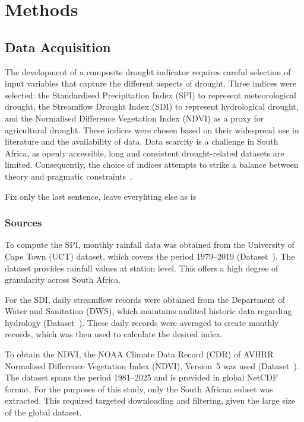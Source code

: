 \graphicspath{{methods/fig/}}

\chapter{Methods}
\label{chap:methods}
\section{Data Acquisition}
\label{sec:data_acquisition}
The development of a composite drought indicator requires careful selection of input variables that capture the different aspects of drought. Three indices were selected: the Standardised Precipitation Index (SPI) to represent meteorological drought, the Streamflow Drought Index (SDI) to represent hydrological drought, and the Normalised Difference Vegetation Index (NDVI) as a proxy for agricultural drought. These indices were chosen based on their widespread use in literature and the availability of data. Data scarcity is a challenge in South Africa, as openly accessible, long and consistent drought-related datasets are limited. Consequently, the choice of indices attempts to strike a balance between theory and pragmatic constraints~\cite{za_drought_review,za_drought_review2,dnbc_drought_first,dnbc_drought_second}.

Fix only the last sentence, leave everyhting else as is
\subsection{Sources}
\label{sec:data_sources}
To compute the SPI, monthly rainfall data was obtained from the University of Cape Town (UCT) dataset, which covers the period 1979–2019 (Dataset~\cite{uct_data}). The dataset provides rainfall values at station level. This offers a high degree of granularity across South Africa.

For the SDI, daily streamflow records were obtained from the Department of Water and Sanitation (DWS), which maintains audited historic data regarding hydrology (Dataset~\cite{DWS_2011}). These daily records were averaged to create monthly records, which was then used to calculate the desired index.

To obtain the NDVI, the NOAA Climate Data Record (CDR) of AVHRR Normalised Difference Vegetation Index (NDVI), Version~5 was used (Dataset~\cite{ndvi_data}). The dataset spans the period 1981–2025 and is provided in global NetCDF format. For the purposes of this study, only the South African subset was extracted. This required targeted downloading and filtering, given the large size of the global dataset.


